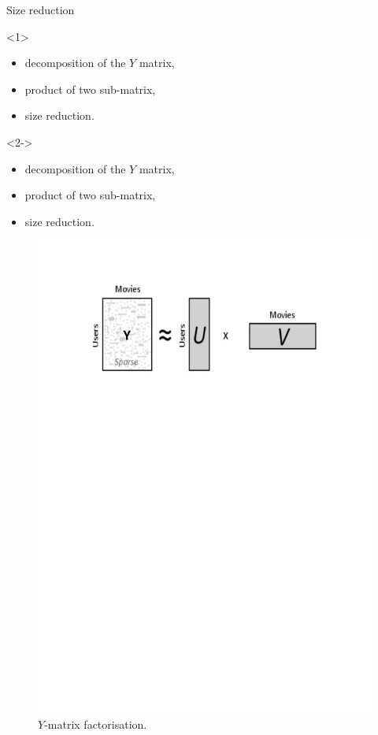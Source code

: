 \documentclass[unknownkeysallowed]{beamer}
\begin{document}
\begin{frame}{Size reduction}
\begin{onlyenv}<1>
\begin{itemize}
    \item decomposition of the $Y$ matrix,
    \item product of two sub-matrix,
    \item size reduction.
\end{itemize}
\end{onlyenv}
\begin{onlyenv}<2->
\begin{itemize}
    \item decomposition of the $Y$ matrix,
    \item product of two sub-matrix,
    \item size reduction.
\end{itemize}
    \begin{figure}[H]
\centering
  \includegraphics[scale=0.4]{./images/facto.pdf}
  \caption{$Y$-matrix factorisation.}
  \label{fig:facto}
\end{figure}
\end{onlyenv}
\end{frame}
\end{document}

